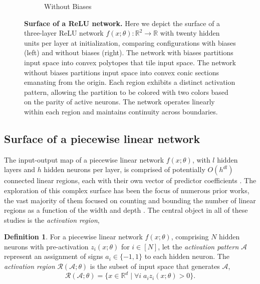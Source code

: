 \documentclass{article}
\theoremstyle{plain}
\theoremstyle{definition}
\newtheorem{definition}[theorem]{Definition}
\theoremstyle{remark}
\begin{document}
\begin{figure}
\begin{subfigure}{0.49\linewidth}
        \caption{Without Biases}
    \end{subfigure}
    \caption{\textbf{Surface of a ReLU network.}
    Here we depict the surface of a three-layer ReLU network $f(x;\theta) : \mathbb{R}^2 \to \mathbb{R}$ with twenty hidden units per layer at initialization, comparing configurations with biases (left) and without biases (right).
    The network with biases partitions input space into convex polytopes that tile input space.
    The network without biases partitions input space into convex conic sections emanating from the origin.
    Each region exhibits a distinct activation pattern, allowing the partition to be colored with two colors based on the parity of active neurons.
    The network operates linearly within each region and maintains continuity across boundaries.
    }
    \vspace{-20pt}
    \label{fig:relu-network-surface}
\end{figure}

\subsection{Surface of a piecewise linear network}
\label{app:nonlinear-surface}

The input-output map of a piecewise linear network $f(x;\theta)$, with $l$ hidden layers and $h$ hidden neurons per layer, is comprised of potentially $O(h^{dl})$ connected linear regions, each with their own vector of predictor coefficients \cite{raghu2017expressive}.
%
The exploration of this complex surface has been the focus of numerous prior works, the vast majority of them focused on counting and bounding the number of linear regions as a function of the width and depth \cite{pascanu2013number, montufar2014number, telgarsky2015representation, arora2016understanding, raghu2017expressive, serra2018bounding, hanin2019complexity, hanin2019deep}.
%
The central object in all of these studies is the \emph{activation region},
%
\begin{definition}
    For a piecewise linear network $f(x;\theta)$, comprising $N$ hidden neurons with pre-activation $z_i(x;\theta)$ for $i \in [N]$, let the \emph{activation pattern} $\mathcal{A}$ represent an assignment of signs $a_i \in \{-1,1\}$ to each hidden neuron.
    The \emph{activation region} $\mathcal{R}(\mathcal{A};\theta)$ is the subset of input space that generates $\mathcal{A}$,
    \begin{equation}
        \mathcal{R}(\mathcal{A};\theta) = \{x \in \mathbb{R}^d \;|\; \forall i \;  a_iz_i(x;\theta) > 0\}.
    \end{equation}
\end{definition}
\end{document}
